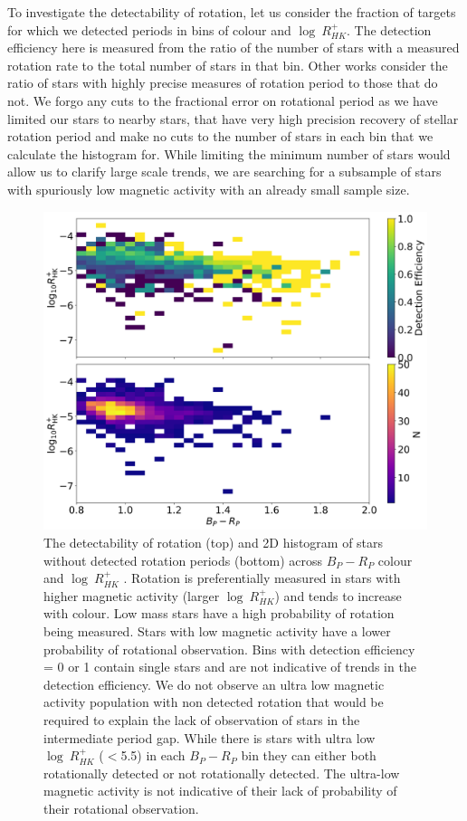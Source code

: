 To investigate the detectability of rotation, let us consider the fraction of targets for which we detected periods in bins of colour and $\log \ R^{+}_{HK}$.
The detection efficiency here is measured from the ratio of the number of stars with a measured rotation rate to the total number of stars in that bin.
Other works \citep[See e.g.]{claytor_recovery_2022} consider the ratio of stars with highly precise measures of rotation period to those that do not.
We forgo any cuts to the fractional error on rotational period as we have limited our stars to nearby stars, that have very high precision recovery of stellar rotation period and make no cuts to the number of stars in each bin that we calculate the histogram for. 
While limiting the minimum number of stars would allow us to clarify large scale trends, we are searching for a subsample of stars with spuriously low magnetic activity with an already small sample size.

\begin{figure}
\centering
    \includegraphics[width=\textwidth]{Figures/rot_gap_figures/detection_efficiency.png}
    \caption{
    	The detectability of rotation (top) and 2D histogram of stars without detected rotation periods (bottom) across \gaia{} $B_P - R_P$ colour and $\log \ R^{+}_{HK}$ . 
	Rotation is preferentially measured in stars with higher magnetic activity (larger $\log \ R^{+}_{HK}$) and tends to increase with colour. Low mass stars have a high probability of rotation being measured. Stars with low magnetic activity have a lower probability of rotational observation. Bins with detection efficiency = 0 or 1 contain single stars and are not indicative of trends in the detection efficiency.
	We do not observe an ultra low magnetic activity population with non detected rotation that would be required to explain the lack of observation of stars in the intermediate period gap.
	While there is stars with ultra low $\log \ R^{+}_{HK}$  ($<$5.5) in each $B_P-R_P$ bin they can either both rotationally detected or not rotationally detected. The ultra-low magnetic activity is not indicative of their lack of probability of their rotational observation.
}
    \label{fig:detection_efficiency_rhk}
\end{figure}

